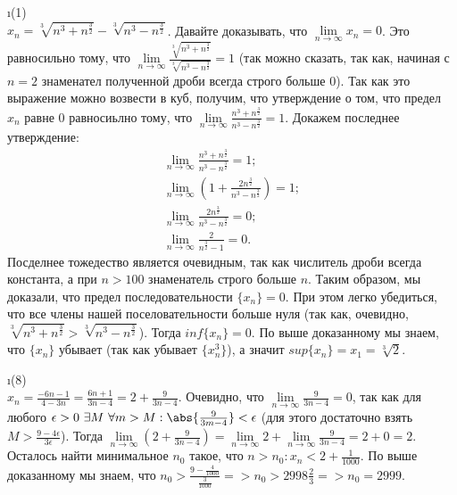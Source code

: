 \i (1)\\
$x_n = \sqrt[3]{n^3 + n^{\frac{3}{2}}} - \sqrt[3]{n^3 - n^{\frac{3}{2}}}$. Давайте доказывать, что $\lim\limits_{n\to\infty}x_n = 0$. Это равносильно тому, что $\lim\limits_{n\to\infty}\frac{\sqrt[3]{n^3+n^{\frac{3}{2}}}}{\sqrt[3]{n^3-n^{\frac{3}{2}}}} = 1$ (так можно сказать, так как, начиная с $n=2$ знаменател полученной дроби всегда строго больше $0$). Так как это выражение можно возвести в куб, получим, что утверждение о том, что предел $x_n$ равне $0$ равносиьлно тому, что $\lim\limits_{n\to\infty}\frac{n^3+n^{\frac{3}{2}}}{n^3-n^{\frac{3}{2}}} = 1.$ Докажем последнее утверждение:
\begin{gather*}
    \lim\limits_{n\to\infty}\frac{n^3+n^{\frac{3}{2}}}{n^3-n^{\frac{3}{2}}} = 1;\\
    \lim\limits_{n\to\infty}(1+\frac{2n^{\frac{3}{2}}}{n^3-n^{\frac{3}{2}}}) = 1;\\
    \lim\limits_{n\to\infty}\frac{2n^{\frac{3}{2}}}{n^3-n^{\frac{3}{2}}} = 0;\\
    \lim\limits_{n\to\infty}\frac{2}{n^{\frac{3}{2}} - 1} = 0.
\end{gather*}
Посделнее тожедество является очевидным, так как числитель дроби всегда константа, а при $n>100$ знаменатель строго больше $n$. Таким образом, мы доказали, что предел последовательности $\{x_n\} = 0$. При этом легко убедиться, что все члены нашей поселовательности больше нуля (так как, очевидно, $\sqrt[3]{n^3 + n^{\frac{3}{2}}} > \sqrt[3]{n^3 - n^{\frac{3}{2}}}$). Тогда $inf\{x_n\} = 0$. По выше доказанному мы знаем, что $\{x_n\}$ убывает (так как убывает $\{x_n^3\}$), а значит $sup\{x_n\} = x_1 = \sqrt[3]{2}$.

\i (8)\\
$x_n = \frac{-6n - 1}{4-3n} = \frac{6n+1}{3n-4} = 2 + \frac{9}{3n-4}$. Очевидно, что $\lim\limits_{n\to\infty}\frac{9}{3n-4} = 0$, так как для любого $\epsilon > 0 \ \exists M \ \forall m > M: \abs{\frac{9}{3m-4}} < \epsilon$ (для этого достаточно взять $M > \frac{9-4\epsilon}{3\epsilon}$). Тогда $\lim\limits_{n\to\infty}(2+\frac{9}{3n-4}) = \lim\limits_{n\to\infty}2 + \lim\limits_{n\to\infty}\frac{9}{3n-4} = 2 + 0 = 2$. Осталось найти минимальное $n_0$ такое, что $n > n_0: x_n < 2 + \frac{1}{1000}$. По выше доказанному мы знаем, что $n_0 > \frac{9 - \frac{4}{1000}}{\frac{3}{1000}} => n_0 > 2998\frac{2}{3} => n_0 = 2999$. 
